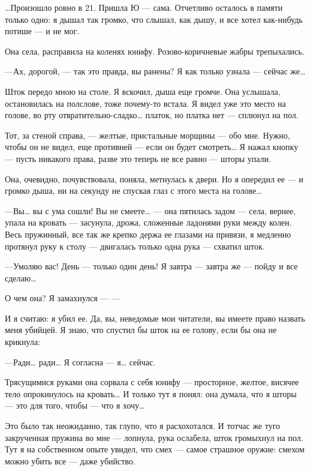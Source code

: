 \documentclass[11pt,openany]{book}
\begin{document}
\ldots{}Произошло ровно в 21. Пришла Ю --- сама. Отчетливо осталось в памяти только одно: я дышал так громко, что слышал, как дышу, и все хотел как-нибудь потише --- и не мог.

Она села, расправила на коленях юнифу. Розово-коричневые жабры трепыхались.

---Ах, дорогой, --- так это правда, вы ранены? Я как только узнала --- сейчас же\ldots{}

Шток передо мною на столе. Я вскочил, дыша еще громче. Она услышала, остановилась на полслове, тоже почему-то встала. Я видел уже это место на голове, во рту отвратительно-сладко\ldots{} платок, но платка нет --- сплюнул на пол.

Тот, за стеной справа, --- желтые, пристальные морщины --- обо мне. Нужно, чтобы он не видел, еще противней --- если он будет смотреть\ldots{} Я нажал кнопку --- пусть никакого права, разве это теперь не все равно --- шторы упали.

Она, очевидно, почувствовала, поняла, метнулась к двери. Но я опередил ее --- и громко дыша, ни на секунду не спуская глаз с этого места на голове\ldots{}

---Вы\ldots{} вы с ума сошли! Вы не смеете\ldots{} --- она пятилась задом --- села, вернее, упала на кровать --- засунула, дрожа, сложенные ладонями руки между колен. Весь пружинный, все так же крепко держа ее глазами на привязи, я медленно протянул руку к столу --- двигалась только одна рука --- схватил шток.

---Умоляю вас! День --- только один день! Я завтра --- завтра же --- пойду и все сделаю\ldots{}

О чем она? Я замахнулся --- ---

И я считаю: я убил ее. Да, вы, неведомые мои читатели, вы имеете право назвать меня убийцей. Я знаю, что спустил бы шток на ее голову, если бы она не крикнула:

---Ради\ldots{} ради\ldots{} Я согласна --- я\ldots{} сейчас.

Трясущимися руками она сорвала с себя юнифу --- просторное, желтое, висячее тело опрокинулось на кровать\ldots{} И только тут я понял: она думала, что я шторы --- это для того, чтобы --- что я хочу\ldots{}

Это было так неожиданно, так глупо, что я расхохотался. И тотчас же туго закрученная пружина во мне --- лопнула, рука ослабела, шток громыхнул на пол. Тут я на собственном опыте увидел, что смех --- самое страшное оружие: смехом можно убить все --- даже убийство.
\end{document}
